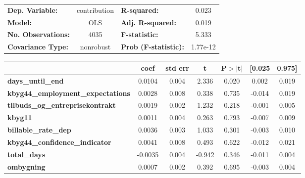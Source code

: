 \begin{center}
\begin{tabular}{lclc}
\toprule
\textbf{Dep. Variable:}                     &  contribution & \textbf{  R-squared:         } &     0.023   \\
\textbf{Model:}                             &      OLS      & \textbf{  Adj. R-squared:    } &     0.019   \\
\textbf{No. Observations:}                  &       4035    & \textbf{  F-statistic:       } &     5.333   \\
\textbf{Covariance Type:}                   &   nonrobust   & \textbf{  Prob (F-statistic):} &  1.77e-12   \\
\bottomrule
\end{tabular}
\begin{tabular}{lcccccc}
                                            & \textbf{coef} & \textbf{std err} & \textbf{t} & \textbf{P$> |$t$|$} & \textbf{[0.025} & \textbf{0.975]}  \\
\midrule
\textbf{days\_until\_end}                   &       0.0104  &        0.004     &     2.336  &         0.020        &        0.002    &        0.019     \\
\textbf{kbyg44\_employment\_expectations}   &       0.0028  &        0.008     &     0.338  &         0.735        &       -0.014    &        0.019     \\
\textbf{tilbuds\_og\_entreprisekontrakt}    &       0.0019  &        0.002     &     1.232  &         0.218        &       -0.001    &        0.005     \\
\textbf{kbyg11}                             &       0.0011  &        0.004     &     0.263  &         0.793        &       -0.007    &        0.009     \\
\textbf{billable\_rate\_dep}                &       0.0036  &        0.003     &     1.033  &         0.301        &       -0.003    &        0.010     \\
\textbf{kbyg44\_confidence\_indicator}      &       0.0041  &        0.008     &     0.493  &         0.622        &       -0.012    &        0.021     \\
\textbf{total\_days}                        &      -0.0035  &        0.004     &    -0.942  &         0.346        &       -0.011    &        0.004     \\
\textbf{ombygning}                          &       0.0007  &        0.002     &     0.392  &         0.695        &       -0.003    &        0.004     \\

\end{tabular}
\end{center}
